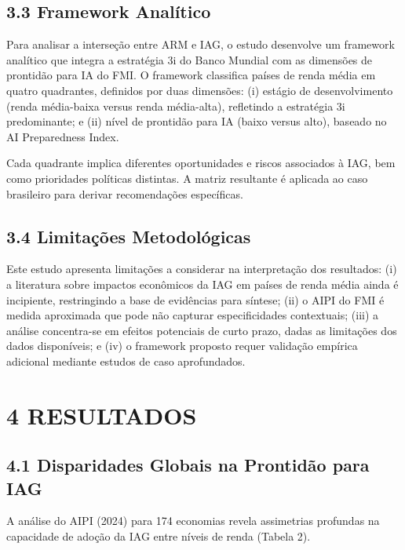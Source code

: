 \documentclass[
  brazilian,
  12pt,
]{article}
\begin{document}
\subsection{3.3 Framework Analítico}\label{framework-analuxedtico}

Para analisar a interseção entre ARM e IAG, o estudo desenvolve um framework analítico que integra a estratégia 3i do Banco Mundial com as dimensões de prontidão para IA do FMI. O framework classifica países de renda média em quatro quadrantes, definidos por duas dimensões: (i) estágio de desenvolvimento (renda média-baixa versus renda média-alta), refletindo a estratégia 3i predominante; e (ii) nível de prontidão para IA (baixo versus alto), baseado no AI Preparedness Index.

Cada quadrante implica diferentes oportunidades e riscos associados à IAG, bem como prioridades políticas distintas. A matriz resultante é aplicada ao caso brasileiro para derivar recomendações específicas.

\subsection{3.4 Limitações Metodológicas}\label{limitauxe7uxf5es-metodoluxf3gicas}

Este estudo apresenta limitações a considerar na interpretação dos resultados: (i) a literatura sobre impactos econômicos da IAG em países de renda média ainda é incipiente, restringindo a base de evidências para síntese; (ii) o AIPI do FMI é medida aproximada que pode não capturar especificidades contextuais; (iii) a análise concentra-se em efeitos potenciais de curto prazo, dadas as limitações dos dados disponíveis; e (iv) o framework proposto requer validação empírica adicional mediante estudos de caso aprofundados.

\newpage

\section{4 RESULTADOS}\label{resultados}

\subsection{4.1 Disparidades Globais na Prontidão para IAG}\label{disparidades-globais-na-prontiduxe3o-para-iag}

A análise do AIPI (2024) para 174 economias revela assimetrias profundas na capacidade de adoção da IAG entre níveis de renda (Tabela 2).
\end{document}
